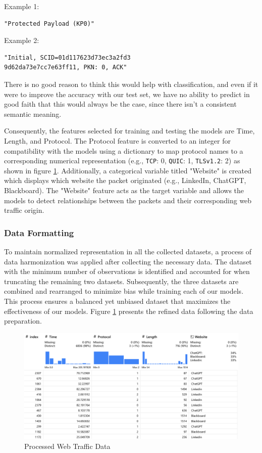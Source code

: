 \documentclass[10pt,sigconf,letterpaper,nonacm]{acmart}
\begin{document}
Example 1:
\begin{verbatim}
"Protected Payload (KP0)"
\end{verbatim}

Example 2:
\begin{verbatim}
"Initial, SCID=01d117623d73ec3a2fd3
9d62da73e7cc7e63ff11, PKN: 0, ACK"
\end{verbatim}

There is no good reason to think this would help with classification, and even if it were to improve the accuracy with our test set, we have no ability to predict in good faith that this would always be the case, since there isn't a consistent semantic meaning.

Consequently, the features selected for training and testing the models are Time, Length, and Protocol. The Protocol feature is converted to an integer for compatibility with 
the models using a dictionary to map protocol names to a corresponding numerical representation (e.g., \texttt{TCP}: 0, \texttt{QUIC}: 1, \texttt{TLSv1.2}: 2) as shown in figure \ref{fig:webTraffic}.  Additionally, a categorical variable titled "Website" 
is created which displays which website the packet originated (e.g., LinkedIn, ChatGPT, Blackboard). The "Website" feature acts as the target variable and allows 
the models to detect relationships between the packets and their corresponding web traffic origin. 

\subsubsection{Data Formatting}
To maintain normalized representation in all the collected datasets, a process of data harmonization 
was applied after collecting the necessary data. The dataset with the minimum number of observations is identified and accounted for when
truncating the remaining two datasets. Subsequently, the three datasets are combined and rearranged to minimize bias while training each of our models.
This process ensures a balanced yet unbiased dataset that maximizes the effectiveness of our models. Figure \ref{fig:webTraffic} presents the refined data following the data preparation. 

\begin{figure}[htp] 
  \centering
  \includegraphics[width=\textwidth]{Figures_and_Graphs/fullDataDiagram.png}
  \caption{Processed Web Traffic Data}
  \label{fig:webTraffic}
\end{figure}
\end{document}
